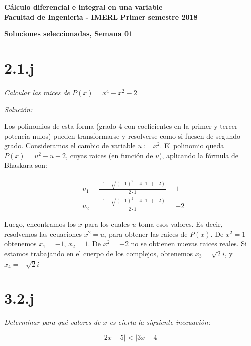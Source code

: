\documentclass[10pt,a4paper]{article}
\begin{document}
 \hfill
          {\bf C\'{a}lculo diferencial e integral en una variable} \\
{\bf Facultad de Ingenier\'{\i}a - IMERL} \hfill {\bf Primer semestre 2018}

\vspace{0,3cm}

\begin{center}
{\bf \Large Soluciones seleccionadas, Semana 01}
\end{center}

\vspace{0,3cm}

\section*{2.1.j}\emph{Calcular las raices de $P(x) = x^4-x^2-2$}


\noindent
\emph{Solución:}


\noindent
Los polinomios de esta forma (grado 4 con coeficientes en la primer y tercer
potencia nulos) pueden transformarse y resolverse como si fuesen de segundo
grado.
Consideramos el cambio de variable
$u := x^2$. El polinomio queda $P(x) = u^2-u-2$,
cuyas raices (en función de $u$), aplicando la f\'ormula
de Bhaskara son:

\begin{equation*}
  \begin{split}
    &u_1 = \frac{-1 + \sqrt{(-1)^2-4\cdot 1 \cdot (-2)}}{2 \cdot 1} = 1\\
    &u_2 = \frac{-1 - \sqrt{(-1)^2-4\cdot 1 \cdot (-2)}}{2 \cdot 1} = -2
  \end{split}
\end{equation*}

\noindent
Luego, encontramos los $x$ para los cuales $u$ toma esos valores.
Es decir, resolvemos las ecuaciones $x^2 = u_i$
para obtener las raices de $P(x)$.
De $x^2=1$ obtenemos $x_1=-1$, $x_2 = 1$. De $x^2=-2$ no se obtienen nuevas
raices reales. Si estamos trabajando en el cuerpo de los complejos,
obtenemos
$x_3 = \sqrt{2} i$, y $x_4 = -\sqrt{2} i$

\section*{3.2.j}
\emph{Determinar para qué valores de $x$ es cierta la siguiente inecuaci\'on:}

\begin{equation*}
  \vert 2x - 5 \vert  <  \vert 3x + 4 \vert
\end{equation*}
\end{document}
